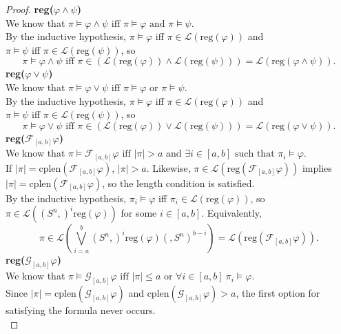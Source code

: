 \documentclass[runningheads]{llncs}
\renewcommand{\phi}{\varphi}
\begin{document}
\begin{proof}
 \noindent \textbf{reg($\varphi \land \psi$)}\\
 We know that $\pi \vDash \varphi \land \psi \text{ iff } \pi \vDash \varphi \text{ and } \pi \vDash \psi$.\\
 By the inductive hypothesis, $\pi \vDash \varphi$ iff $\pi \in \mathscr{L}(\text{reg}(\varphi))$ and 
 \\$\pi \vDash \psi$ iff $\pi \in \mathscr{L}(\text{reg}(\psi))$, so
 $$\pi \vDash \varphi \land \psi \text{ iff } \pi \in (\mathscr{L}(\text{reg}(\varphi)) \land \mathscr{L}(\text{reg}(\psi))) = \mathscr{L}(\text{reg}(\varphi \land \psi)).$$
 \noindent \textbf{reg($\varphi \lor \psi$)}\\
 We know that $\pi \vDash \varphi \lor \psi \text{ iff } \pi \vDash \varphi \text{ or } \pi \vDash \psi$.\\
 By the inductive hypothesis, $\pi \vDash \varphi$ iff $\pi \in \mathscr{L}(\text{reg}(\varphi))$ and 
 \\$\pi \vDash \psi$ iff $\pi \in \mathscr{L}(\text{reg}(\psi))$, so
 $$\pi \vDash \varphi \lor \psi \text{ iff } \pi \in (\mathscr{L}(\text{reg}(\varphi)) \lor \mathscr{L}(\text{reg}(\psi))) = \mathscr{L}(\text{reg}(\varphi \lor \psi)).$$
 \noindent \textbf{reg($\mathcal{F}_{[a,b]} \varphi$)}\\
 We know that $\pi \vDash \mathcal{F}_{[a,b]} \varphi \text{ iff } |\pi| > a \text{ and } \exists i \in [a,b] \text{ such that } \pi_i \vDash \varphi$.\\
 If $|\pi| = \text{cplen}(\mathcal{F}_{[a,b]} \varphi)$, $|\pi| > a$. Likewise, $\pi \in \mathscr{L}\left(\text{reg}\left(\mathcal{F}_{[a,b]} \varphi \right)\right)$ implies $|\pi| = \text{cplen}(\mathcal{F}_{[a,b]} \varphi)$, so the length condition is satisfied.\\
 By the inductive hypothesis, $\pi_i \vDash \varphi$ iff $\pi_i \in \mathscr{L}(\text{reg}(\varphi))$, so $\pi \in \mathscr{L}((S^n,)^i \text{reg}(\varphi))$ for some $i \in [a,b]$. Equivalently, 
 $$\pi \in \mathscr{L}\left(\bigvee_{i=a}^{b} (S^n,)^i \text{reg}(\phi)(,S^n)^{b-i}\right) = \mathscr{L}(\text{reg}(\mathcal{F}_{[a,b]}\varphi)).$$
 \noindent \textbf{reg($\mathcal{G}_{[a,b]} \varphi$)}\\
 We know that $\pi \vDash \mathcal{G}_{[a,b]}\varphi \text{ iff } |\pi| \leq a \text{ or } \forall i \in [a,b] \ \pi_i \vDash \varphi$.\\
 Since $|\pi| = \text{cplen}(\mathcal{G}_{[a,b]} \varphi)$ and $\text{cplen}(\mathcal{G}_{[a,b]} \varphi) > a$, the first option for satisfying the formula never occurs.\\

\end{proof}
\end{document}
